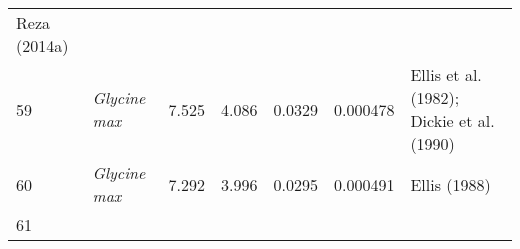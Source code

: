 \documentclass[]{article}
\begin{document}
\begin{longtable}[]{@{}lllllll@{}}
\begin{minipage}[t]{0.23\columnwidth}
Reza (2014a)\strut
\end{minipage}\tabularnewline
\begin{minipage}[t]{0.05\columnwidth}\raggedright
59\strut
\end{minipage} & \begin{minipage}[t]{0.23\columnwidth}\raggedright
\emph{Glycine max}\strut
\end{minipage} & \begin{minipage}[t]{0.05\columnwidth}\raggedright
7.525\strut
\end{minipage} & \begin{minipage}[t]{0.08\columnwidth}\raggedright
4.086\strut
\end{minipage} & \begin{minipage}[t]{0.08\columnwidth}\raggedright
0.0329\strut
\end{minipage} & \begin{minipage}[t]{0.08\columnwidth}\raggedright
0.000478\strut
\end{minipage} & \begin{minipage}[t]{0.23\columnwidth}\raggedright
Ellis et al. (1982); Dickie et al. (1990)\strut
\end{minipage}\tabularnewline
\begin{minipage}[t]{0.05\columnwidth}\raggedright
60\strut
\end{minipage} & \begin{minipage}[t]{0.23\columnwidth}\raggedright
\emph{Glycine max}\strut
\end{minipage} & \begin{minipage}[t]{0.05\columnwidth}\raggedright
7.292\strut
\end{minipage} & \begin{minipage}[t]{0.08\columnwidth}\raggedright
3.996\strut
\end{minipage} & \begin{minipage}[t]{0.08\columnwidth}\raggedright
0.0295\strut
\end{minipage} & \begin{minipage}[t]{0.08\columnwidth}\raggedright
0.000491\strut
\end{minipage} & \begin{minipage}[t]{0.23\columnwidth}\raggedright
Ellis (1988)\strut
\end{minipage}\tabularnewline
\begin{minipage}[t]{0.05\columnwidth}\raggedright
61\strut
\end{minipage} & \begin{minipage}[t]{0.23\columnwidth}\raggedright

\end{minipage}
\end{longtable}
\end{document}

